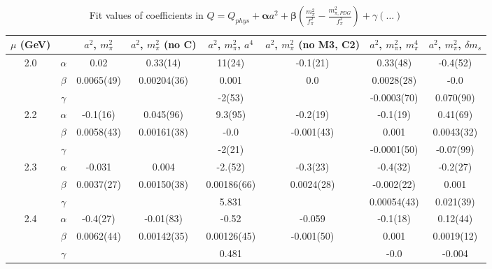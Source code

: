 \documentclass[12pt]{extarticle}
\begin{document}
\begin{table}[h!]
\begin{center}
\begin{tabular}{|c c|c|c|c|c|c|c|}
\hline
$\mu$ (GeV) &  & $a^2$, $m_\pi^2$& $a^2$, $m_\pi^2$ (no C)& $a^2$, $m_\pi^2$, $a^4$& $a^2$, $m_\pi^2$ (no M3, C2)& $a^2$, $m_\pi^2$, $m_\pi^4$& $a^2$, $m_\pi^2$, $\delta m_s$\\
\hline
\multirow{3}{0.5in}{2.0} & $\alpha$ & 0.02& 0.33(14)& 11(24)& -0.1(21)& 0.33(48)& -0.4(52)\\
 & $\beta$ & 0.0065(49)& 0.00204(36)& 0.001& 0.0& 0.0028(28)& -0.0\\
 & $\gamma$ &  &  & -2(53)&  & -0.0003(70)& 0.070(90)\\
\hline
\multirow{3}{0.5in}{2.2} & $\alpha$ & -0.1(16)& 0.045(96)& 9.3(95)& -0.2(19)& -0.1(19)& 0.41(69)\\
 & $\beta$ & 0.0058(43)& 0.00161(38)& -0.0& -0.001(43)& 0.001& 0.0043(32)\\
 & $\gamma$ &  &  & -2(21)&  & -0.0001(50)& -0.07(99)\\
\hline
\multirow{3}{0.5in}{2.3} & $\alpha$ & -0.031& 0.004& -2.(52)& -0.3(23)& -0.4(32)& -0.2(27)\\
 & $\beta$ & 0.0037(27)& 0.00150(38)& 0.00186(66)& 0.0024(28)& -0.002(22)& 0.001\\
 & $\gamma$ &  &  & 5.831&  & 0.00054(43)& 0.021(39)\\
\hline
\multirow{3}{0.5in}{2.4} & $\alpha$ & -0.4(27)& -0.01(83)& -0.52& -0.059& -0.1(18)& 0.12(44)\\
 & $\beta$ & 0.0062(44)& 0.00142(35)& 0.00126(45)& -0.001(50)& 0.001& 0.0019(12)\\
 & $\gamma$ &  &  & 0.481&  & -0.0& -0.004\\
\hline
\end{tabular}
\caption{Fit values of coefficients in $Q = Q_{phys} + \mathbf{\alpha} a^2 + \mathbf{\beta}\left(\frac{m_\pi^2}{f_\pi^2}-\frac{m_{\pi,PDG}^2}{f_\pi^2}\right) + \gamma(\ldots)$}
\end{center}
\end{table}









\end{document}
